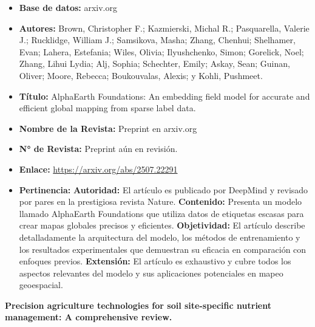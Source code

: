 \begin{itemize}
  \item \textbf{Base de datos:} arxiv.org
  \item \textbf{Autores:}  Brown, Christopher F.; Kazmierski, Michal R.; Pasquarella, Valerie J.; Rucklidge, William J.; Samsikova, Masha; Zhang, Chenhui; Shelhamer, Evan; Lahera, Estefania; Wiles, Olivia; Ilyushchenko, Simon; Gorelick, Noel; Zhang, Lihui Lydia; Alj, Sophia; Schechter, Emily; Askay, Sean; Guinan, Oliver; Moore, Rebecca; Boukouvalas, Alexis; y Kohli, Pushmeet.
  \item \textbf{Título:} AlphaEarth Foundations: An embedding field model for accurate and efficient global mapping from sparse label data.
  \item \textbf{Nombre de la Revista:} Preprint en arxiv.org
  \item \textbf{N° de Revista:} Preprint aún en revisión.
  \item \textbf{Enlace:} \url{https://arxiv.org/abs/2507.22291}
  \item \textbf{Pertinencia:}
  \subitem \textbf{Autoridad:} El artículo es publicado por DeepMind y revisado por pares en la prestigiosa revista Nature.
  \subitem \textbf{Contenido:} Presenta un modelo llamado AlphaEarth Foundations que utiliza datos de etiquetas escasas para crear mapas globales precisos y eficientes.
  \subitem \textbf{Objetividad:} El artículo describe detalladamente la arquitectura del modelo, los métodos de entrenamiento y los resultados experimentales que demuestran su eficacia en comparación con enfoques previos.
  \subitem \textbf{Extensión:} El artículo es exhaustivo y cubre todos los aspectos relevantes del modelo y sus aplicaciones potenciales en mapeo geoespacial.
\end{itemize}

\textbf{Precision agriculture technologies for soil site-speciﬁc nutrient
management: A comprehensive review. \cite{Vullaganti2025}}

